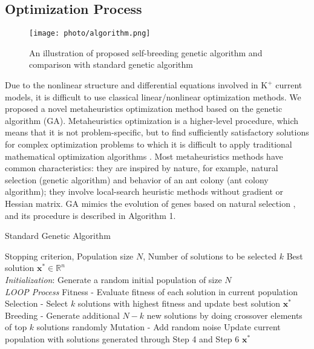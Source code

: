 \documentclass[journal]{IEEEtran}
\begin{document}
\subsection{Optimization Process}
\begin{figure}
    \label{fig5}
    \centering
    \texttt{[image: photo/algorithm.png]}
    \caption{An illustration of proposed self-breeding genetic algorithm and comparison with standard genetic algorithm}
\end{figure}
Due to the nonlinear structure and differential equations involved in $\text{K}^{+}$ current models, it is difficult to use classical linear/nonlinear optimization methods. We proposed a novel metaheuristics optimization method based on the genetic algorithm (GA). Metaheuristics optimization is a higher-level procedure, which means that it is not problem-specific, but to find sufficiently satisfactory solutions for complex optimization problems to which it is difficult to apply traditional mathematical optimization algorithms \cite{boussaid2013survey}. Most metaheuristics methods have common characteristics: they are inspired by nature, for example, natural selection (genetic algorithm) and behavior of an ant colony (ant colony algorithm); they involve local-search heuristic methods without gradient or Hessian matrix. GA mimics the evolution of genes based on natural selection \cite{holland1992adaptation}, and its procedure is described in Algorithm 1.
\begin{algorithm}
    \caption{Standard Genetic Algorithm}
    \begin{algorithmic}[1]
        \renewcommand{\algorithmicrequire}{\textbf{Input:}}
        \renewcommand{\algorithmicensure}{\textbf{Output:}}
        \REQUIRE Stopping criterion, Population size $N$, Number of solutions to be selected $k$
        \ENSURE Best solution $\mathbf{x^*} \in \mathbb{R}^n$
        \\ \textit{Initialization}:
        \STATE Generate a random initial population of size $N$
        \\ \textit{LOOP Process}
        \STATE Fitness - Evaluate fitness of each solution in current population
        \STATE Selection - Select $k$ solutions with highest fitness and update best solution $\mathbf{x^{*}}$
        \STATE Breeding - Generate additional $N-k$ new solutions by doing crossover elements of top $k$ solutions randomly
        \STATE Mutation - Add random noise 
        \STATE Update current population with solutions generated through Step 4 and Step 6
        \ENDWHILE
        \RETURN $\mathbf{x^{*}}$ 
    \end{algorithmic} 
\end{algorithm}
\end{document}
